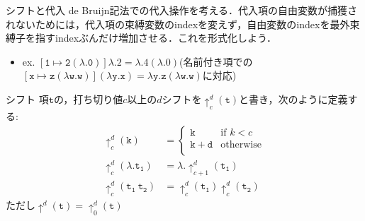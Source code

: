 \documentclass[9pt]{beamer}
\begin{document}
\begin{frame}{シフトと代入}
de Bruijn記法での代入操作を考える．代入項の自由変数が捕獲されないためには，代入項の束縛変数のindexを変えず，自由変数のindexを最外束縛子を指すindexぶんだけ増加させる．これを形式化しよう．\begin{itemize}
\item ex. $\mathtt{\left[1 \mapsto 2(\lambda. 0)\right]\lambda.2 = \lambda.4(\lambda.0)}$(名前付き項での$\mathtt{\left[x\mapsto z(\lambda w. w)\right](\lambda y. x) = \lambda y. z(\lambda w.w)}$に対応)
\end{itemize}
	\begin{dblock}{シフト}
	項$\mathtt{t}$の，打ち切り値$c$以上の$d$シフトを$\uparrow_{c}^{d}(\mathtt{t})$と書き，次のように定義する:
	\begin{align*}
		\uparrow_{c}^{d}(\mathtt{k})&=\begin{cases}
			\mathtt{k} & \text{if $k < c$}\\
			\mathtt{k + d} &\text{otherwise}\\
		\end{cases}\\
		\uparrow_{c}^{d}(\lambda.\mathtt{t_{1}})&=\lambda. \uparrow_{c + 1}^{d}(\mathtt{t_{1}})\\
		\uparrow_{c}^{d}(\mathtt{t_{1}}\ \mathtt{t_{2}})&=\uparrow_{c}^{d}(\mathtt{t_{1}})\uparrow_{c}^{d}(\mathtt{t_{2}})
	\end{align*}
	ただし$\uparrow^{d}(\mathtt{t}) = \uparrow_{0}^{d}(\mathtt{t})$
	\end{dblock}
\end{frame}
\end{document}
